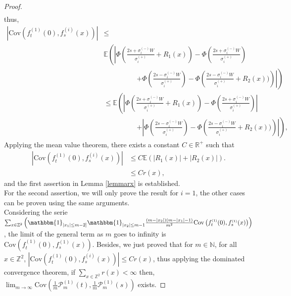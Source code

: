 \documentclass[12pt]{article}
\theoremstyle{Theorem}
\theoremstyle{definition}
\begin{document}
\begin{proof}
{\begin{align*}
\end{align*}
}
thus, 
{\small
\begin{align*}
 |\text{Cov}\left(f_{t}^{\scriptscriptstyle(1)}(0), f_{s}^{\scriptscriptstyle(i)}(x) \right)| & \leq \\
 &  \mathbb{E}\left(\left|\Phi\left(\frac{2s + \sigma^{\scriptscriptstyle (-)}_{i}W}{\sigma^{\scriptscriptstyle (+)}_{i}} + R_{1}(x) \right)  - \Phi\left(\frac{2s + \sigma^{\scriptscriptstyle (-)}_{i}W}{\sigma^{\scriptscriptstyle (+)}_{i}} \right) \right. \right. \\
 & \hspace{2cm} \left. \left.+ \Phi\left(\frac{2s - \sigma^{\scriptscriptstyle (-)}_{i}W}{\sigma^{\scriptscriptstyle (+)}_{i}} \right) - \Phi\left(\frac{2s -\sigma^{\scriptscriptstyle (-)}_{i}W }{\sigma^{\scriptscriptstyle (+)}_{i}} + R_{2}(x))\right)\right|\right) \\
 & \leq \mathbb{E}\left(\left|\Phi\left(\frac{2s + \sigma^{\scriptscriptstyle (-)}_{i}W}{\sigma^{\scriptscriptstyle (+)}_{i}} + R_{1}(x) \right)  - \Phi\left(\frac{2s + \sigma^{\scriptscriptstyle (-)}_{i}W}{\sigma^{\scriptscriptstyle (+)}_{i}} \right) \right| \right. \\
 & \hspace{2cm} \left. + \left| \Phi\left(\frac{2s - \sigma^{\scriptscriptstyle (-)}_{i}W}{\sigma^{\scriptscriptstyle (+)}_{i}} \right) - \Phi\left(\frac{2s -\sigma^{\scriptscriptstyle (-)}_{i}W }{\sigma^{\scriptscriptstyle (+)}_{i}} + R_{2}(x))\right)\right|\right),
 \end{align*}}
Applying the mean value theorem, there exists a constant $C \in \mathbb{R}^{+}$ such that 
\begin{align*}
 |\text{Cov}\left(f_{t}^{\scriptscriptstyle(1)}(0), f_{s}^{\scriptscriptstyle(i)}(x) \right)| & \leq C\mathbb{E}\left(|R_{1}(x)| + |R_{2}(x)|\right). \\
& \leq Cr(x), 
\end{align*}
and the first assertion in Lemma \ref{lemmarx} is established.\\
For the second assertion, we will only prove the result for $i =1$, the other cases can be proven using the same arguments. \\
Considering the serie $\sum_{x \in \mathbb{Z}^{2}}\left(\mathbbm{1}_{|x_{1}| \leq m-2]}\mathbbm{1}_{|x_{2}| \leq m-1} \frac{(m-|x_2|)(m-|x_1| -1)}{m^2} \text{Cov}\left(f_{t}^{\scriptscriptstyle(1)}(0), f_{s}^{\scriptscriptstyle(1)}(x) \right) \right)$,
the limit of the general term as $m$ goes to infinity is $\text{Cov}\left(f_{t}^{\scriptscriptstyle(1)}(0), f_{s}^{\scriptscriptstyle(1)}(x) \right)$.
Besides, we just proved that for $m \in \mathbb{N}$, for all $x\in \mathbb{Z}^{2}$, $\left|\text{Cov}\left(f_{t}^{\scriptscriptstyle(1)}(0), f_{s}^{\scriptscriptstyle(i)}(x)\right)\right| \leq Cr(x)$, thus applying the dominated convergence theorem, if $\sum_{x \in \mathbb{Z}^{2}} r(x) < \infty$ then, $\lim_{m \to \infty}\text{Cov}\left(\frac{1}{m}\mathcal{P}_{m}^{\scriptscriptstyle (1)}(t), \frac{1}{m}\mathcal{P}_{m}^{\scriptscriptstyle (1)}(s) \right)$ exists.
\end{proof}
\end{document}
